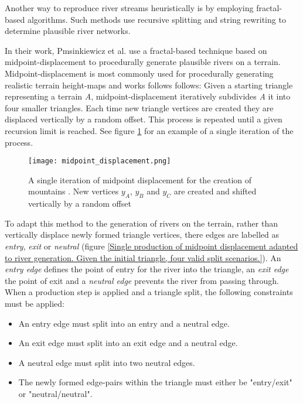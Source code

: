 Another way to reproduce river streams heuristically is by employing fractal-based algorithms. Such methods use recursive splitting and string rewriting to determine plausible river networks. 

In their work, Pmsinkiewicz et al. use a fractal-based technique based on midpoint-displacement to procedurally generate plausible rivers on a terrain. Midpoint-displacement is most commonly used for procedurally generating realistic terrain height-maps and works follows follows: Given a starting triangle representing a terrain \textit{A}, midpoint-displacement iteratively subdivides \textit{A} it into four smaller triangles. Each time new triangle vertices are created they are displaced vertically by a random offset. This process is repeated until a given recursion limit is reached. See figure \ref{Midpoint displacement} for an example of a single iteration of the process.

\begin{figure}[h]
  \centering
	\label{Midpoint displacement}
	\texttt{[image: midpoint\_displacement.png]}
	\caption{A single iteration of midpoint displacement for the creation of mountains \cite{Prusinkiewicz1993}. New vertices $y_{A}$, $y_{B}$ and $y_{C}$ are created and shifted vertically by a random offset}
\end{figure}

To adapt this method to the generation of rivers on the terrain, rather than vertically displace newly formed triangle vertices, there edges are labelled as \textit{entry}, \textit{exit} or \textit{neutral} (figure \ref{Single production of midpoint displacement adapted to river generation. Given the initial triangle, four valid split scenarios.}). An \textit{entry edge} defines the point of entry for the river into the triangle, an \textit{exit edge} the point of exit and a \textit{neutral edge} prevents the river from passing through. \\

When a production step is applied and a triangle split, the following constraints must be applied:
\begin{itemize}
\item An entry edge must split into an entry and a neutral edge.
\item An exit edge must split into an exit edge and a neutral edge.
\item A neutral edge must split into two neutral edges.
\item The newly formed edge-pairs within the triangle must either be "entry/exit" or "neutral/neutral".
\end{itemize}

